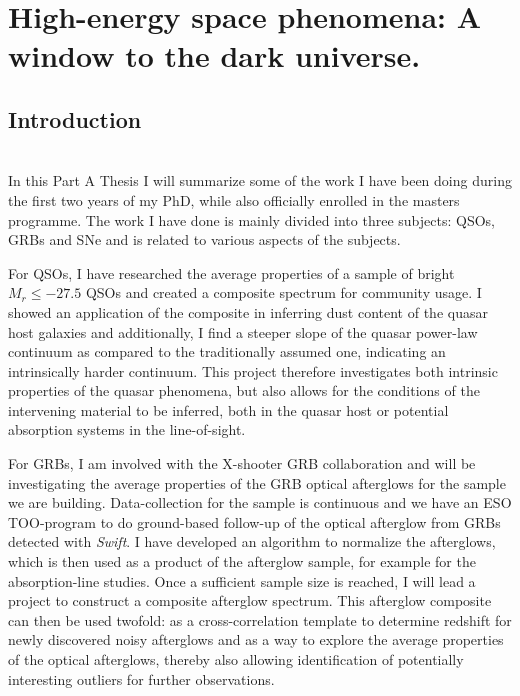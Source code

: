 %
\chapter{High-energy space phenomena: A window to the dark universe.}
\section{Introduction}
\label{sec:intro}

 \\

In this Part A Thesis I will summarize some of the work I have been doing during
the
first two years of my PhD, while also officially enrolled in the masters
programme. The work I have done is mainly divided into three subjects: QSOs,
GRBs and SNe and is related to various aspects of the subjects. 

For QSOs, I have researched the average properties of a sample of bright $M_{r}
\leq -27.5$ QSOs and created a composite spectrum for community usage. I showed
an application of the composite in inferring dust content of the quasar host
galaxies and additionally, I find a steeper slope of the quasar power-law
continuum
as compared to the traditionally assumed one, indicating an
intrinsically harder
continuum. This project therefore investigates both
intrinsic properties of the
quasar phenomena, but also allows for the conditions
of the intervening material to be
inferred, both in the quasar host or potential
absorption systems in the
line-of-sight.

For GRBs, I am involved with the X-shooter GRB collaboration and will be
investigating the average properties of the GRB optical afterglows for the
sample we are building. Data-collection for the sample is continuous and we have
an ESO TOO-program to do ground-based follow-up of the optical afterglow from
GRBs detected with \textit{Swift}.  I have developed an algorithm to normalize
the afterglows, which is then used  as a product of the afterglow sample, for
example for the absorption-line studies. Once a sufficient sample size is
reached, I will lead a project to construct a composite afterglow spectrum. This
afterglow composite can then be used twofold: as a cross-correlation template to
determine redshift for newly discovered noisy afterglows and as a way to
explore
the average properties of the optical afterglows, thereby also allowing
identification of potentially interesting outliers for further observations. 

